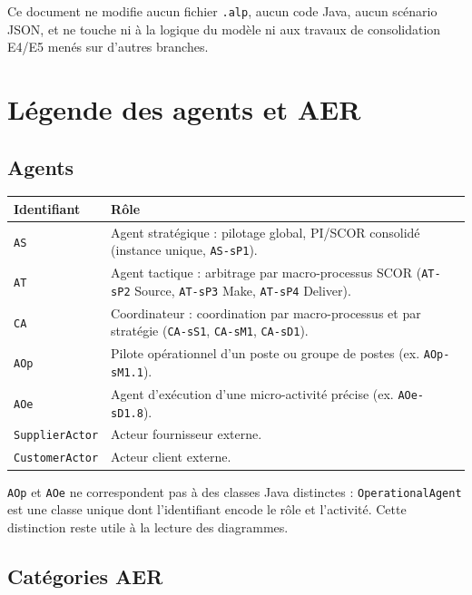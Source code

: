 \documentclass[11pt,a4paper]{article}
\newcommand{\code}[1]{\texttt{#1}}
\begin{document}
Ce document ne modifie aucun fichier \code{.alp}, aucun code Java, aucun scénario JSON, et ne touche ni à la logique du modèle ni aux travaux de consolidation E4/E5 menés sur d'autres branches.

\section{Légende des agents et AER}

\subsection{Agents}

\begin{center}
\begin{tabularx}{\textwidth}{lX}
\toprule
Identifiant & Rôle \\
\midrule
\code{AS} & Agent stratégique : pilotage global, PI/SCOR consolidé (instance unique, \code{AS-sP1}). \\
\code{AT} & Agent tactique : arbitrage par macro-processus SCOR (\code{AT-sP2} Source, \code{AT-sP3} Make, \code{AT-sP4} Deliver). \\
\code{CA} & Coordinateur : coordination par macro-processus et par stratégie (\code{CA-sS1}, \code{CA-sM1}, \code{CA-sD1}). \\
\code{AOp} & Pilote opérationnel d'un poste ou groupe de postes (ex. \code{AOp-sM1.1}). \\
\code{AOe} & Agent d'exécution d'une micro-activité précise (ex. \code{AOe-sD1.8}). \\
\code{SupplierActor} & Acteur fournisseur externe. \\
\code{CustomerActor} & Acteur client externe. \\
\bottomrule
\end{tabularx}
\end{center}

\code{AOp} et \code{AOe} ne correspondent pas à des classes Java distinctes : \code{OperationalAgent} est une classe unique dont l'identifiant encode le rôle et l'activité. Cette distinction reste utile à la lecture des diagrammes.

\subsection{Catégories AER}
\label{sec:aer}
\end{document}
